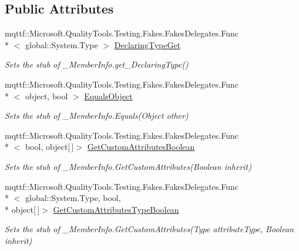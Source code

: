\subsection*{Public Attributes}
\begin{DoxyCompactItemize}
\item 
mqttf\-::\-Microsoft.\-Quality\-Tools.\-Testing.\-Fakes.\-Fakes\-Delegates.\-Func\\*
$<$ global\-::\-System.\-Type $>$ \hyperlink{class_system_1_1_runtime_1_1_interop_services_1_1_fakes_1_1_stub___member_info_aef496d589b661184ab4cf69920e5e643}{Declaring\-Type\-Get}
\begin{DoxyCompactList}\small\item\em Sets the stub of \-\_\-\-Member\-Info.\-get\-\_\-\-Declaring\-Type()\end{DoxyCompactList}\item 
mqttf\-::\-Microsoft.\-Quality\-Tools.\-Testing.\-Fakes.\-Fakes\-Delegates.\-Func\\*
$<$ object, bool $>$ \hyperlink{class_system_1_1_runtime_1_1_interop_services_1_1_fakes_1_1_stub___member_info_af76b839c3efbb21fea5adf8e1da6f23c}{Equals\-Object}
\begin{DoxyCompactList}\small\item\em Sets the stub of \-\_\-\-Member\-Info.\-Equals(\-Object other)\end{DoxyCompactList}\item 
mqttf\-::\-Microsoft.\-Quality\-Tools.\-Testing.\-Fakes.\-Fakes\-Delegates.\-Func\\*
$<$ bool, object\mbox{[}$\,$\mbox{]}$>$ \hyperlink{class_system_1_1_runtime_1_1_interop_services_1_1_fakes_1_1_stub___member_info_a44031408bc0b5d5a3336be36fb8faf2e}{Get\-Custom\-Attributes\-Boolean}
\begin{DoxyCompactList}\small\item\em Sets the stub of \-\_\-\-Member\-Info.\-Get\-Custom\-Attributes(\-Boolean inherit)\end{DoxyCompactList}\item 
mqttf\-::\-Microsoft.\-Quality\-Tools.\-Testing.\-Fakes.\-Fakes\-Delegates.\-Func\\*
$<$ global\-::\-System.\-Type, bool, \\*
object\mbox{[}$\,$\mbox{]}$>$ \hyperlink{class_system_1_1_runtime_1_1_interop_services_1_1_fakes_1_1_stub___member_info_a41f1b25685f7dd26b7e88b9b7798b833}{Get\-Custom\-Attributes\-Type\-Boolean}
\begin{DoxyCompactList}\small\item\em Sets the stub of \-\_\-\-Member\-Info.\-Get\-Custom\-Attributes(\-Type attribute\-Type, Boolean inherit)\end{DoxyCompactList}\item 

\end{DoxyCompactItemize}
